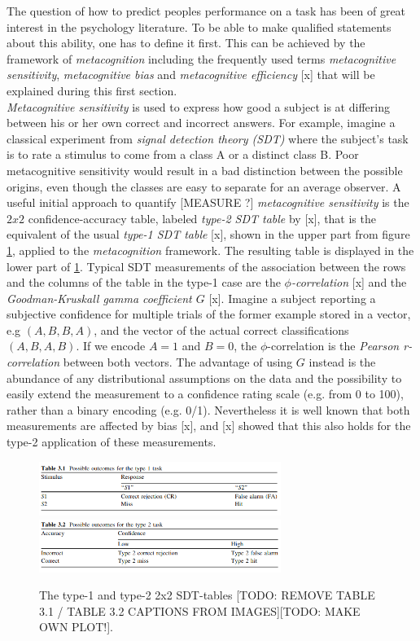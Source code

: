 \documentclass[../main/main.tex]{subfiles}
\begin{document}
	The question of how to predict peoples performance on a task has been of great interest in the psychology literature. To be able to make qualified statements about this ability, one has to define it first.
	This can be achieved by the framework of \textit{metacognition} including the frequently used terms \textit{metacognitive sensitivity}, \textit{metacognitive bias} and \textit{metacognitive efficiency} [x] that will be explained during this first section.\\
	\textit{Metacognitive sensitivity} is used to express how good a subject is at differing between his or her own correct and incorrect answers. For example, imagine a classical experiment from \textit{signal detection theory (SDT)} where the subject's task is to rate a stimulus to come from a class A or a distinct class B. Poor metacognitive sensitivity would result in a bad distinction between the possible origins, even though the classes are easy to separate for an average observer. A useful initial approach to quantify [MEASURE ?] \textit{metacognitive sensitivity} is the $2x2$ confidence-accuracy table, labeled \textit{type-2 SDT table} by [x], that is the equivalent of the usual \textit{type-1 SDT table} [x], shown in the upper part from figure \ref{fig:tables}, applied to the \textit{metacognition} framework. The resulting table is displayed in the lower part of \ref{fig:tables}. Typical SDT measurements of the association between the rows and the columns of the table in the type-1 case are the \textit{$\phi$-correlation} [x] and the \textit{Goodman-Kruskall gamma coefficient $G$} [x]. Imagine a subject reporting a subjective confidence for multiple trials of the former example stored in a vector, e.g $(A, B, B, A)$, and the vector of the actual correct classifications $(A, B, A, B)$. If we encode $A=1$ and $B=0$, the $\phi$-correlation is the \textit{Pearson r-correlation} between both vectors. The advantage of using $G$ instead is the abundance of any distributional assumptions on the data and the possibility to easily extend the measurement to a confidence rating scale (e.g. from 0 to 100), rather than a binary encoding (e.g. 0/1). Nevertheless it is well known that both measurements are affected by bias [x], and [x] showed that this also holds for the type-2 application of these measurements.
	\begin{figure}[h]
		\centering
		\captionsetup{justification=centering}
		\includegraphics[width=0.7\textwidth]{../assets/type1_sdt_table.png}
		\includegraphics[width=0.7\textwidth]{../assets/type2_sdt_table.png}
		\caption{The type-1 and type-2 2x2 SDT-tables [TODO: REMOVE TABLE 3.1 / TABLE 3.2 CAPTIONS FROM IMAGES][TODO: MAKE OWN PLOT!].} 
		\label{fig:tables}
	\end{figure}
\end{document}
